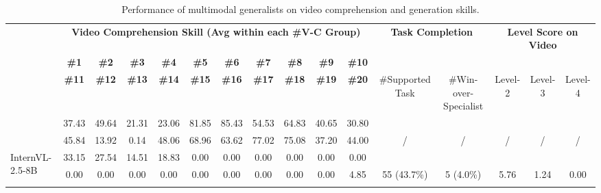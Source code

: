 \documentclass[letterpaper]{article} %
\begin{document}

\begin{table*}[t!]
\centering
\caption{
Performance of multimodal generalists on video comprehension and generation skills.
}
\label{tab:main-overall-results-video}
\fontsize{7.5}{8}\selectfont 
\setlength{\tabcolsep}{1mm}
\vspace{-2mm}
\begin{tabular}{p{2cm} cccccccccc cc ccc}
\toprule
\rowcolor{bg-tb-heavey-video} & \multicolumn{10}{c}{\bf \textcolor{greenCom}{Video Comprehension Skill (Avg within each \#V-C Group)}} & \multicolumn{2}{c}{\bf Task Completion} & \multicolumn{3}{c}{\bf Level Score on Video} \\ 
\rowcolor{bg-tb-heavey-video} & \bf\#1 & \bf\#2 & \bf\#3 & \bf\#4 & \bf\#5 & \bf\#6 & \bf\#7 & \bf\#8 & \bf\#9 & \bf\#10 & 
 &  &  &  &  \\
\rowcolor{bg-tb-heavey-video} \multicolumn{1}{c}{\multirow{-3}{*}{\bf  Model}}  & \bf \#11 & \bf\#12 & \bf\#13 & \bf\#14 & \bf\#15 & \bf\#16 & \bf\#17 & \bf\#18 & \bf\#19 & \bf\#20 & 
\multicolumn{1}{c}{\multirow{-2}{*}{\parbox{1.2cm}{\#Supported Task}}} & \multicolumn{1}{c}{\multirow{-2}{*}{\parbox{1.2cm}{\#Win-over-Specialist}}} & \multicolumn{1}{c}{\multirow{-2}{*}{Level-2}}  & \multicolumn{1}{c}{\multirow{-2}{*}{Level-3}}  & \multicolumn{1}{c}{\multirow{-2}{*}{Level-4}}  \\

\midrule


\rowcolor{bg-tb-light-video} & 37.43 & 49.64 & 21.31 & 23.06 & 81.85 & 85.43 & 54.53 & 64.83 & 40.65 & 30.80 &  &  &  &  &  \\
\rowcolor{bg-tb-light-video} \multirow{-2}{*}{\bf SoTA Specialist} & 45.84 & 13.92 & 0.14 & 48.06 & 68.96 & 63.62 & 77.02 & 75.08 & 37.20 & 44.00 & \multirow{-2}{*}{/} & \multirow{-2}{*}{/} & \multirow{-2}{*}{/} & \multirow{-2}{*}{/} & \multirow{-2}{*}{/} \\


\midrule\midrule

\multirow{2}{*}{ InternVL-2.5-8B} & 33.15 & 27.54 & 14.51 & 18.83 & 0.00 & 0.00 & 0.00 & 0.00 & 0.00 &0.00 &  &  &  &  &  \\
& 0.00 & 0.00 & 0.00 & 0.00 & 0.00 & 0.00 & 0.00 & 0.00 & 0.00 & 4.85 & \multirow{-2}{*}{55 (43.7\%)} & \multirow{-2}{*}{5 (4.0\%)} & \multirow{-2}{*}{5.76} & \multirow{-2}{*}{1.24} & \multirow{-2}{*}{0.00} \\

\addlinespace[4pt]



\end{tabular}
\end{table*}
\end{document}
